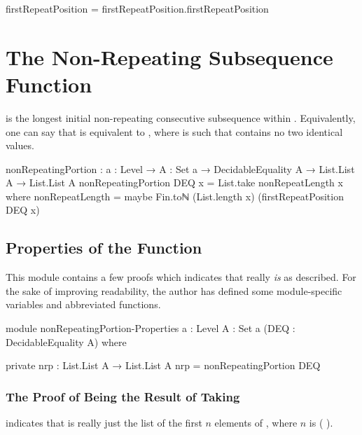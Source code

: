 \documentclass{report}
\begin{document}
\begin{code}
firstRepeatPosition = firstRepeatPosition.firstRepeatPosition
\end{code}

\section{The Non-Repeating Subsequence Function}
   is the longest initial non-repeating consecutive subsequence within .  Equivalently, one can say that    is equivalent to   , where  is such that    contains no two identical values.

\begin{code}
nonRepeatingPortion : {a : Level} →
                      {A : Set a} →
                      DecidableEquality A →
                      List.List A →
                      List.List A
nonRepeatingPortion DEQ x = List.take nonRepeatLength x
  where nonRepeatLength = maybe Fin.toℕ (List.length x) (firstRepeatPosition DEQ x)
\end{code}

\subsection{Properties of the Function}
This module contains a few proofs which indicates that  really \emph{is} as described.  For the sake of improving readability, the author has defined some module-specific variables and abbreviated functions.

\begin{code}
module nonRepeatingPortion-Properties
  {a : Level}
  {A : Set a}
  (DEQ : DecidableEquality A) where

  private
    nrp : List.List A → List.List A
    nrp = nonRepeatingPortion DEQ
\end{code}

\subsubsection{The Proof of Being the Result of Taking}
  indicates that   is really just the list of the first \(n\) elements of , where \(n\) is  \AgdaSymbol( \AgdaSymbol).
\end{document}
